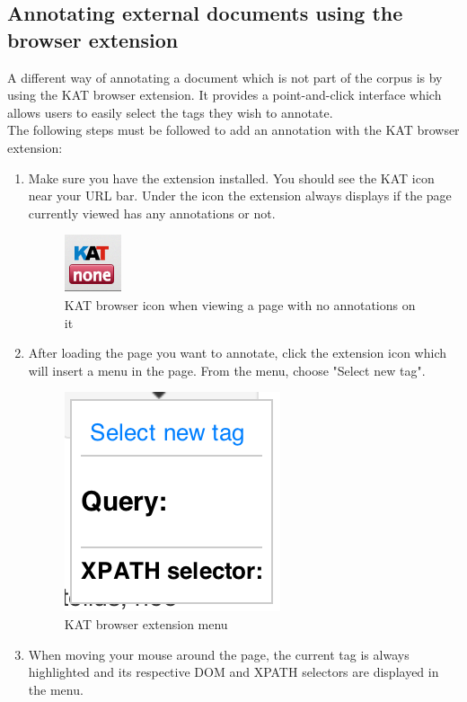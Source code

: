 \subsection{Annotating external documents using the browser extension}
A different way of annotating a document which is not part of the corpus is by
using the KAT browser extension. It provides a point-and-click interface which
allows users to easily select the tags they wish to annotate. \\
The following steps must be followed to add an annotation with the KAT browser extension:
\begin{enumerate}
\item Make sure you have the extension installed. You should see the KAT icon near your URL bar.
  Under the icon the extension always displays if the page currently viewed has any annotations or not.
  \begin{figure}[ht]\centering
  \includegraphics{../PIC/extension-browser-icon-none}
  \caption{KAT browser icon when viewing a page with no annotations on it}\label{fig:extension-browser-icon-none}
  \end{figure}
\item After loading the page you want to annotate, click the extension icon which will insert a menu in the page. From the menu, choose "Select new tag".
  \begin{figure}[ht]\centering
  \includegraphics{../PIC/extension-menu}
  \caption{KAT browser extension menu}\label{fig:extension-menu}
  \end{figure}
\item When moving your mouse around the page, the current tag is always highlighted and its respective DOM and XPATH selectors are displayed in the menu.

\end{enumerate}
